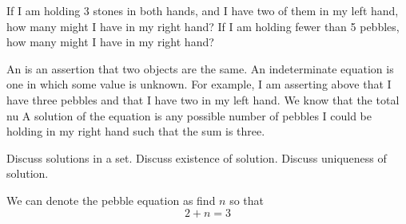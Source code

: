 
\sbasic



\sstart



If I am holding
3 stones
in both hands,
and I have two of
them in my left hand,
how many might I have
in my right hand?
If I am holding
fewer than 5 pebbles, how
many might I have in my right hand?


An
is an assertion that
two objects are the same.
An indeterminate
equation is one in
which some value
is unknown.
For example, I am
asserting above
that I have three
pebbles and that
I have two in my
left hand.
We know that the
total nu
A solution of
the equation
is any possible
number of pebbles
I could be holding
in my right hand
such that the sum
is three.

Discuss solutions
in a set.
Discuss existence
of solution.
Discuss uniqueness
of solution.


We can
denote the pebble
equation as
find $n$ so that
\[
  2 + n = 3
\]

\strats
